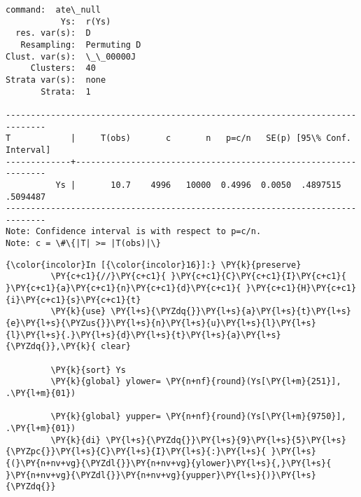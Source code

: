 \documentclass[11pt,notitlepage]{article}\usepackage[]{graphicx}\usepackage[]{color}
\makeatletter
\newenvironment{kframe}{%
 \def\at@end@of@kframe{}%
 \ifinner\ifhmode%
  \def\at@end@of@kframe{\end{minipage}}%
  \begin{minipage}{\columnwidth}%
 \fi\fi%
 \def\FrameCommand##1{\hskip\@totalleftmargin \hskip-\fboxsep
 \colorbox{shadecolor}{##1}\hskip-\fboxsep
     \hskip-\linewidth \hskip-\@totalleftmargin \hskip\columnwidth}%
 \MakeFramed {\advance\hsize-\width
   \@totalleftmargin\z@ \linewidth\hsize
   \@setminipage}}%
 {\par\unskip\endMakeFramed%
 \at@end@of@kframe}
\newenvironment{knitrout}{}{} %
\makeatother
\begin{document}
\begin{enumerate}[a)]
\begin{knitrout}
\begin{kframe}
\begin{Verbatim}[commandchars=\\\{\}]
      command:  ate\_null
           Ys:  r(Ys)
  res. var(s):  D
   Resampling:  Permuting D
Clust. var(s):  \_\_00000J
     Clusters:  40
Strata var(s):  none
       Strata:  1

------------------------------------------------------------------------------
T            |     T(obs)       c       n   p=c/n   SE(p) [95\% Conf. Interval]
-------------+----------------------------------------------------------------
          Ys |       10.7    4996   10000  0.4996  0.0050  .4897515   .5094487
------------------------------------------------------------------------------
Note: Confidence interval is with respect to p=c/n.
Note: c = \#\{|T| >= |T(obs)|\}

    \end{Verbatim}

    \begin{Verbatim}[commandchars=\\\{\}]
{\color{incolor}In [{\color{incolor}16}]:} \PY{k}{preserve}
         \PY{c+c1}{//}\PY{c+c1}{ }\PY{c+c1}{C}\PY{c+c1}{I}\PY{c+c1}{ }\PY{c+c1}{a}\PY{c+c1}{n}\PY{c+c1}{d}\PY{c+c1}{ }\PY{c+c1}{H}\PY{c+c1}{i}\PY{c+c1}{s}\PY{c+c1}{t}
         \PY{k}{use} \PY{l+s}{\PYZdq{}}\PY{l+s}{a}\PY{l+s}{t}\PY{l+s}{e}\PY{l+s}{\PYZus{}}\PY{l+s}{n}\PY{l+s}{u}\PY{l+s}{l}\PY{l+s}{l}\PY{l+s}{.}\PY{l+s}{d}\PY{l+s}{t}\PY{l+s}{a}\PY{l+s}{\PYZdq{}},\PY{k}{ clear}
         
         \PY{k}{sort} Ys
         \PY{k}{global} ylower= \PY{n+nf}{round}(Ys[\PY{l+m}{251}], .\PY{l+m}{01})
         
         \PY{k}{global} yupper= \PY{n+nf}{round}(Ys[\PY{l+m}{9750}], .\PY{l+m}{01})
         \PY{k}{di} \PY{l+s}{\PYZdq{}}\PY{l+s}{9}\PY{l+s}{5}\PY{l+s}{\PYZpc{}}\PY{l+s}{C}\PY{l+s}{I}\PY{l+s}{:}\PY{l+s}{ }\PY{l+s}{(}\PY{n+nv+vg}{\PYZdl{}}\PY{n+nv+vg}{ylower}\PY{l+s}{,}\PY{l+s}{ }\PY{n+nv+vg}{\PYZdl{}}\PY{n+nv+vg}{yupper}\PY{l+s}{)}\PY{l+s}{\PYZdq{}} 
         

\end{Verbatim}
\end{kframe}
\end{knitrout}
\end{enumerate}
\end{document}
